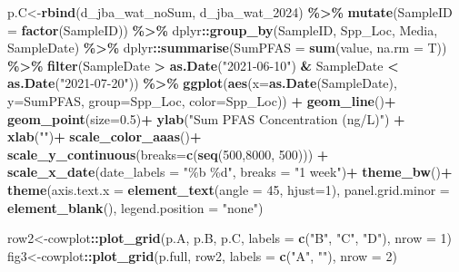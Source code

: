 \documentclass[
]{article}
\newenvironment{Shaded}{\begin{snugshade}}{\end{snugshade}}
\newcommand{\AttributeTok}[1]{\textcolor[rgb]{0.13,0.29,0.53}{#1}}
\newcommand{\DecValTok}[1]{\textcolor[rgb]{0.00,0.00,0.81}{#1}}
\newcommand{\FloatTok}[1]{\textcolor[rgb]{0.00,0.00,0.81}{#1}}
\newcommand{\FunctionTok}[1]{\textcolor[rgb]{0.13,0.29,0.53}{\textbf{#1}}}
\newcommand{\NormalTok}[1]{#1}
\newcommand{\OtherTok}[1]{\textcolor[rgb]{0.56,0.35,0.01}{#1}}
\newcommand{\SpecialCharTok}[1]{\textcolor[rgb]{0.81,0.36,0.00}{\textbf{#1}}}
\newcommand{\StringTok}[1]{\textcolor[rgb]{0.31,0.60,0.02}{#1}}
\begin{document}
\begin{Shaded}
\begin{Highlighting}[]
\NormalTok{p.C}\OtherTok{\textless{}{-}}\FunctionTok{rbind}\NormalTok{(d\_jba\_wat\_noSum, d\_jba\_wat\_2024) }\SpecialCharTok{\%\textgreater{}\%}
  \FunctionTok{mutate}\NormalTok{(}\AttributeTok{SampleID =} \FunctionTok{factor}\NormalTok{(SampleID)) }\SpecialCharTok{\%\textgreater{}\%}
\NormalTok{  dplyr}\SpecialCharTok{::}\FunctionTok{group\_by}\NormalTok{(SampleID, Spp\_Loc, Media, SampleDate) }\SpecialCharTok{\%\textgreater{}\%}
\NormalTok{  dplyr}\SpecialCharTok{::}\FunctionTok{summarise}\NormalTok{(}\AttributeTok{SumPFAS =} \FunctionTok{sum}\NormalTok{(value, }\AttributeTok{na.rm =}\NormalTok{ T)) }\SpecialCharTok{\%\textgreater{}\%}
  \FunctionTok{filter}\NormalTok{(SampleDate }\SpecialCharTok{\textgreater{}} \FunctionTok{as.Date}\NormalTok{(}\StringTok{"2021{-}06{-}10"}\NormalTok{) }\SpecialCharTok{\&}\NormalTok{ SampleDate }\SpecialCharTok{\textless{}} \FunctionTok{as.Date}\NormalTok{(}\StringTok{"2021{-}07{-}20"}\NormalTok{)) }\SpecialCharTok{\%\textgreater{}\%} 
    \FunctionTok{ggplot}\NormalTok{(}\FunctionTok{aes}\NormalTok{(}\AttributeTok{x=}\FunctionTok{as.Date}\NormalTok{(SampleDate), }\AttributeTok{y=}\NormalTok{SumPFAS, }\AttributeTok{group=}\NormalTok{Spp\_Loc, }\AttributeTok{color=}\NormalTok{Spp\_Loc)) }\SpecialCharTok{+}
    \FunctionTok{geom\_line}\NormalTok{()}\SpecialCharTok{+}
    \FunctionTok{geom\_point}\NormalTok{(}\AttributeTok{size=}\FloatTok{0.5}\NormalTok{)}\SpecialCharTok{+}
    \FunctionTok{ylab}\NormalTok{(}\StringTok{"Sum PFAS Concentration (ng/L)"}\NormalTok{) }\SpecialCharTok{+}
    \FunctionTok{xlab}\NormalTok{(}\StringTok{""}\NormalTok{)}\SpecialCharTok{+}
    \FunctionTok{scale\_color\_aaas}\NormalTok{()}\SpecialCharTok{+}
    \FunctionTok{scale\_y\_continuous}\NormalTok{(}\AttributeTok{breaks=}\FunctionTok{c}\NormalTok{(}\FunctionTok{seq}\NormalTok{(}\DecValTok{500}\NormalTok{,}\DecValTok{8000}\NormalTok{, }\DecValTok{500}\NormalTok{))) }\SpecialCharTok{+}
    \FunctionTok{scale\_x\_date}\NormalTok{(}\AttributeTok{date\_labels =} \StringTok{"\%b \%d"}\NormalTok{, }\AttributeTok{breaks =} \StringTok{"1 week"}\NormalTok{)}\SpecialCharTok{+}
    \FunctionTok{theme\_bw}\NormalTok{()}\SpecialCharTok{+}
    \FunctionTok{theme}\NormalTok{(}\AttributeTok{axis.text.x =} \FunctionTok{element\_text}\NormalTok{(}\AttributeTok{angle =} \DecValTok{45}\NormalTok{, }\AttributeTok{hjust=}\DecValTok{1}\NormalTok{),}
          \AttributeTok{panel.grid.minor =} \FunctionTok{element\_blank}\NormalTok{(),}
          \AttributeTok{legend.position =} \StringTok{"none"}\NormalTok{)}

\NormalTok{row2}\OtherTok{\textless{}{-}}\NormalTok{cowplot}\SpecialCharTok{::}\FunctionTok{plot\_grid}\NormalTok{(p.A, p.B, p.C,  }
                   \AttributeTok{labels =} \FunctionTok{c}\NormalTok{(}\StringTok{"B"}\NormalTok{, }\StringTok{"C"}\NormalTok{, }\StringTok{"D"}\NormalTok{),}
                   \AttributeTok{nrow =} \DecValTok{1}\NormalTok{)}
\NormalTok{fig3}\OtherTok{\textless{}{-}}\NormalTok{cowplot}\SpecialCharTok{::}\FunctionTok{plot\_grid}\NormalTok{(p.full, row2, }
                   \AttributeTok{labels =} \FunctionTok{c}\NormalTok{(}\StringTok{"A"}\NormalTok{, }\StringTok{""}\NormalTok{),}
                   \AttributeTok{nrow =} \DecValTok{2}\NormalTok{)}


\end{Highlighting}
\end{Shaded}
\end{document}
